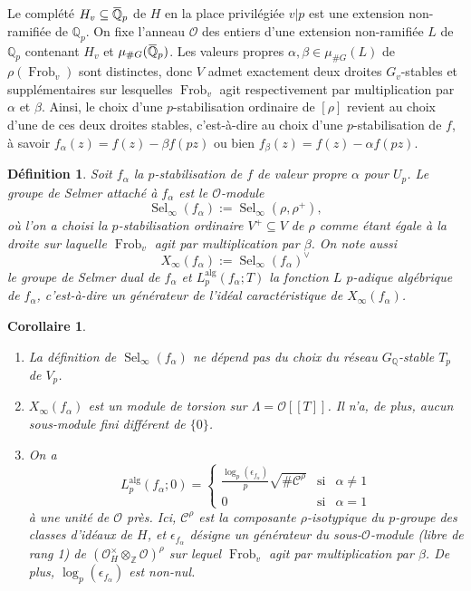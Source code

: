 \documentclass[12pt]{amsart}
\newcommand\bZ{\mathbb{Z}}
\newcommand\bQ{\mathbb{Q}}
\newcommand\Qp{\mathbb{Q}_{p}}
\newcommand\cC{\mathcal{C}}
\newcommand\cO{\mathcal{O}}
\newcommand{\ob}[1]{\mkern 1.5mu\overline{\mkern-1.5mu#1\mkern-1.5mu}\mkern 1.5mu}
\newcommand{\alg}{\textrm{alg}}
\DeclareMathOperator{\Frob}{Frob}
\DeclareMathOperator{\Sel}{Sel}
\theoremstyle{defstyle}
\newtheorem{definition}[subsubsection]{Définition}
\theoremstyle{thmstyle}
\newtheorem{corollaire}[subsubsection]{Corollaire}
\begin{document}
Le complété $H_v \subseteq \ob{\bQ}_p$ de $H$ en la place privilégiée $v|p$ est une extension non-ramifiée de $\Qp$. On fixe l'anneau $\cO$ des entiers d'une extension non-ramifiée $L$ de $\Qp$ contenant $H_v$ et $\mu_{\#G}(\ob{\bQ}_p)$. Les valeurs propres $\alpha,\beta\in \mu_{\#G}(L)$ de $\rho(\Frob_v)$ sont distinctes, donc $V$ admet exactement deux droites $G_v$-stables et supplémentaires sur lesquelles $\Frob_v$ agit respectivement par multiplication par $\alpha$ et $\beta$. Ainsi, le choix d'une $p$-stabilisation ordinaire de $[\rho]$ revient au choix d'une de ces deux droites stables, c'est-à-dire au choix d'une $p$-stabilisation de $f$, à savoir $f_\alpha(z)=f(z)-\beta f(pz)$ ou bien $f_\beta(z)=f(z)-\alpha f(pz)$.

\begin{definition}\label{def:sel_f_alpha}
	Soit $f_\alpha$ la $p$-stabilisation de $f$ de valeur propre $\alpha$ pour $U_p$. Le groupe de Selmer attaché à $f_\alpha$ est le $\cO$-module 
	$$\Sel_\infty(f_\alpha) := \Sel_\infty(\rho,\rho^+),$$
	où l'on a choisi la $p$-stabilisation ordinaire $V^+\subseteq V$ de $\rho$ comme étant égale à la droite sur laquelle $\Frob_v$ agit par multiplication par $\beta$. On note aussi 
	$$X_\infty(f_\alpha) := \Sel_\infty(f_\alpha)^\vee$$
	le groupe de Selmer dual de $f_\alpha$ et $L_p^{\alg}(f_\alpha;T)$ la fonction $L$ $p$-adique algébrique de $f_\alpha$, c'est-à-dire un générateur de l'idéal caractéristique de $X_\infty(f_\alpha)$.
\end{definition}

\begin{corollaire}\label{prop:rappel_prop_sel_n_f_alpha}
	
	\begin{enumerate}
		\item La définition de $\Sel_\infty(f_\alpha)$ ne dépend pas du choix du réseau $G_{\bQ}$-stable $T_p$ de $V_p$.
		\item $X_\infty(f_\alpha)$ est un module de torsion sur $\Lambda=\cO[[T]]$. Il n'a, de plus, aucun sous-module fini différent de $\{0\}$.
		\item On a 
		$$L_p^{\alg}(f_\alpha;0)= \left\{\begin{array}{rcl}
		\frac{\log_p\left(\epsilon_{f_\alpha}\right)}{p} \sqrt{\#\cC^{\rho}} & \mbox{si}& \alpha\neq 1 \\
		0 & \mbox{si}& \alpha=1
		\end{array}\right.$$
		à une unité de $\cO$ près. Ici, $\cC^{\rho}$ est la composante $\rho$-isotypique du $p$-groupe des classes d'idéaux de $H$, et $\epsilon_{f_\alpha}$ désigne un générateur du sous-$\cO$-module (libre de rang 1) de $(\cO_H^\times \otimes_{\bZ} \cO)^{\rho}$ sur lequel $\Frob_v$ agit par multiplication par $\beta$. De plus, $\log_p\left(\epsilon_{f_\alpha}\right)$ est non-nul.
	\end{enumerate}
\end{corollaire}
\end{document}
